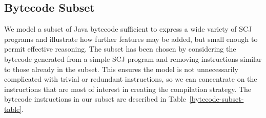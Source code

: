 \subsection{Bytecode Subset}
\label{cee-bytecode-subset-subsection}

We model a subset of Java bytecode sufficient to express a wide
variety of SCJ programs and illustrate how further features may be
added, but small enough to permit effective reasoning.
The subset has been chosen by considering the bytecode generated from
a simple SCJ program and removing instructions similar to those
already in the subset.
This ensures the model is not unnecessarily complicated with trivial
or redundant instructions, so we can concentrate on the instructions
that are most of interest in creating the compilation strategy.
The bytecode instructions in our subset are described in
Table~\ref{bytecode-subset-table}.

